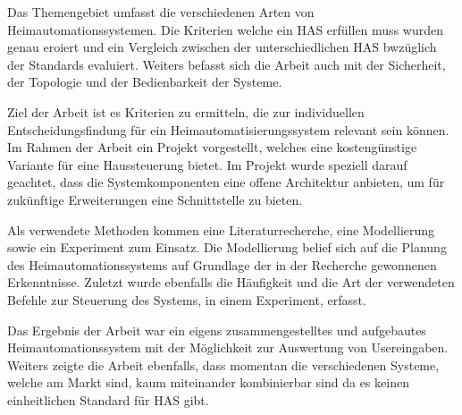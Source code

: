 

 Das Themengebiet umfasst die verschiedenen Arten von
Heimautomationssystemen. Die Kriterien welche ein HAS erfüllen muss wurden
genau eroiert und ein Vergleich zwischen der unterschiedlichen HAS bwzüglich
der Standards evaluiert. Weiters befasst sich die Arbeit auch mit der
Sicherheit, der Topologie und der Bedienbarkeit der Systeme.

 Ziel der Arbeit ist es Kriterien zu ermitteln, die
zur individuellen Entscheidungsfindung für ein Heimautomatisierungssystem
relevant sein können. Im Rahmen der Arbeit ein Projekt vorgestellt, welches
eine kostengünstige Variante für eine Haussteuerung bietet. Im Projekt wurde
speziell darauf geachtet, dass die Systemkomponenten eine offene Architektur
anbieten, um für zukünftige Erweiterungen eine Schnittstelle zu bieten.

 Als verwendete Methoden kommen eine
Literaturrecherche, eine Modellierung sowie ein Experiment zum Einsatz. Die
Modellierung belief sich auf die Planung des Heimautomationssystems auf
Grundlage der in der Recherche gewonnenen Erkenntnisse. Zuletzt wurde
ebenfalls die Häufigkeit und die Art der verwendeten Befehle zur Steuerung des
Systems, in einem Experiment, erfasst.

 Das Ergebnis der Arbeit war ein eigens zusammengestelltes
und aufgebautes Heimautomationssystem mit der Möglichkeit zur Auswertung von
Usereingaben. Weiters zeigte die Arbeit ebenfalls, dass momentan die
verschiedenen Systeme, welche am Markt sind, kaum miteinander kombinierbar
sind da es keinen einheitlichen Standard für HAS gibt.


%
\section*{\thesisheading} %



